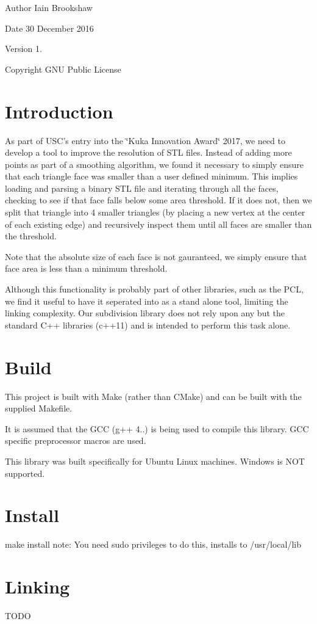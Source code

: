 \begin{DoxyAuthor}{Author}
Iain Brookshaw 
\end{DoxyAuthor}
\begin{DoxyDate}{Date}
30 December 2016 
\end{DoxyDate}
\begin{DoxyVersion}{Version}
1. 
\end{DoxyVersion}
\begin{DoxyCopyright}{Copyright}
G\-N\-U Public License
\end{DoxyCopyright}
\hypertarget{index_Introduction}{}\section{Introduction}\label{index_Introduction}
As part of U\-S\-C's entry into the \char`\"{}\-Kuka Innovation Award\char`\"{} 2017, we need to develop a tool to improve the resolution of S\-T\-L files. Instead of adding more points as part of a smoothing algorithm, we found it necessary to simply ensure that each triangle face was smaller than a user defined minimum. This implies loading and parsing a binary S\-T\-L file and iterating through all the faces, checking to see if that face falls below some area threshold. If it does not, then we split that triangle into 4 smaller triangles (by placing a new vertex at the center of each existing edge) and recursively inspect them until all faces are smaller than the threshold.

Note that the absolute size of each face is not gauranteed, we simply ensure that face area is less than a minimum threshold.

Although this functionality is probably part of other libraries, such as the P\-C\-L, we find it useful to have it seperated into as a stand alone tool, limiting the linking complexity. Our subdivision library does not rely upon any but the standard C++ libraries (c++11) and is intended to perform this task alone.\hypertarget{index_Build}{}\section{Build}\label{index_Build}
This project is built with Make (rather than C\-Make) and can be built with the supplied Makefile.

It is assumed that the G\-C\-C (g++ 4..) is being used to compile this library. G\-C\-C specific preprocessor macros are used.

This library was built specifically for Ubuntu Linux machines. Windows is N\-O\-T supported.\hypertarget{index_Install}{}\section{Install}\label{index_Install}
make install note\-: You need sudo privileges to do this, installs to /usr/local/lib\hypertarget{index_Linking}{}\section{Linking}\label{index_Linking}
T\-O\-D\-O

